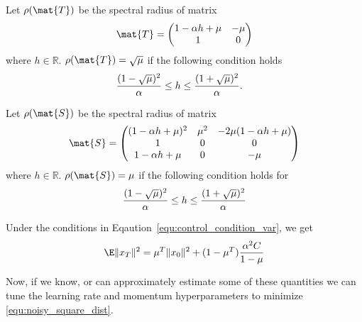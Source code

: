 \begin{lemma}
\label{lem:2times2_spectral_radius}
	Let $\rho(\mat{T})$ be the spectral radius of matrix  
\begin{equation}
	\mat{T} = \begin{pmatrix}
	1-\alpha h + \mu & - \mu\\
	1 & 0 \\
	\end{pmatrix}
\end{equation}
where $h\in \mathbb{R}$. $\rho(\mat{T}) = \sqrt{\mu}$ if the following condition holds
\begin{align}
{(1-\sqrt{\mu})^2\over \alpha} &\leq h \leq {(1+\sqrt{\mu})^2\over \alpha}.
\label{equ:control_condition_scalar}
\end{align}
\end{lemma}

\begin{lemma}
\label{lem:3times3_spectral_radius}
Let $\rho(\mat{S})$ be the spectral radius of matrix 
\begin{equation}
\mat{S} = {\begin{pmatrix}
(1-\alpha h + \mu)^2 &  \mu^2 & -2\mu(1-\alpha h + \mu)\\
1 & 0 & 0 \\
1-\alpha h + \mu & 0 & - \mu
\end{pmatrix}}
\end{equation}
where $h\in \mathbb{R}$.
$\rho(\mat{S})=\mu$ if the following condition holds for
\begin{equation}
{(1-\sqrt{\mu})^2\over \alpha} \leq h \leq {(1+\sqrt{\mu})^2\over \alpha}
\label{equ:control_condition_var}
\end{equation}
\end{lemma}



\begin{corollary}
\label{cor:}
Under the conditions in Eqaution~\eqref{equ:control_condition_var}, we get
\begin{equation}
	\E \| x_T \|^2 
	= \mu^T \| x_0 \|^2
		+ (1-\mu^T) \frac{\alpha^2 C}{1-\mu}
	\label{equ:noisy_square_dist}
\end{equation}
\label{cor:noisy_dist}
\end{corollary}

Now, if we know, or can approximately estimate some of these quantities we can tune the learning rate and momentum hyperparameters to minimize  \eqref{equ:noisy_square_dist}.





